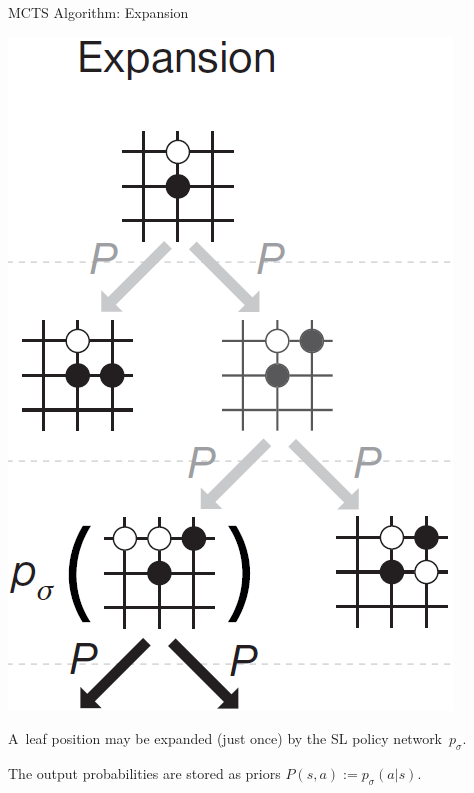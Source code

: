 \documentclass{beamer}
\begin{document}
{    \begin{frame}{MCTS Algorithm: Expansion}
      \begin{center}
        \includegraphics[height=.6\textheight]{../img/MCTS_expansion.png}
      \end{center}
      \pause

      \tiny
      A~leaf position may be expanded (just once) by the SL policy network~$p_\sigma$.
      \pause

      The output probabilities are stored as priors $P(s,a) := p_\sigma (a|s)$.
    \end{frame}

}
\end{document}
